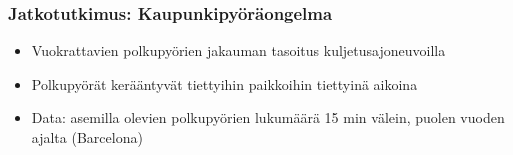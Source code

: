 \documentclass{beamer}
\begin{document}
\begin{frame}
  \frametitle{Jatkotutkimus: Kaupunkipyöräongelma}   %
\begin{itemize}
\item
Vuokrattavien polkupyörien jakauman tasoitus kuljetusajoneuvoilla
\item
Polkupyörät kerääntyvät tiettyihin paikkoihin tiettyinä aikoina
\item
Data: asemilla olevien polkupyörien lukumäärä 15 min välein, puolen vuoden ajalta (Barcelona)
 \end{itemize}
\end{frame}



    
\end{document}
